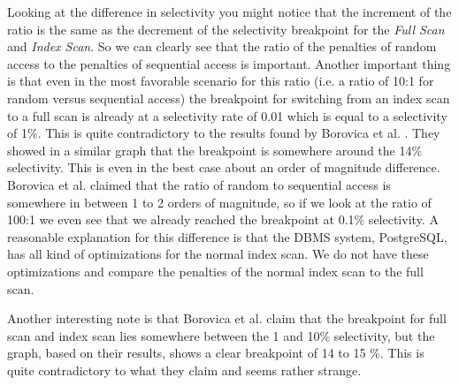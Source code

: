 \documentclass[a4paper,11pt,twoside]{article}
\begin{document}
Looking at the difference in selectivity you might notice that the increment of the ratio is the same as the decrement of the selectivity breakpoint for the  \textit{Full Scan} and \textit{Index Scan}. So we can clearly see that the ratio of the penalties of random access to the penalties of sequential access is important. Another important thing is that even in the most favorable scenario for this ratio (i.e. a ratio of 10:1 for random versus sequential access) the breakpoint for switching from an index scan to a full scan is already at a selectivity rate of 0.01 which is equal to a selectivity of 1$\%$. This is quite contradictory to the results found by Borovica et al. \cite{smoothscan}. They showed in a similar graph that the breakpoint is somewhere around the 14$\%$ selectivity. This is even in the best case about an order of magnitude difference. Borovica et al. claimed that the ratio of random to sequential access is somewhere in between 1 to 2 orders of magnitude, so if we look at the ratio of 100:1 we even see that we already reached the breakpoint at 0.1$\%$ selectivity. A reasonable explanation for this difference is that the DBMS system, PostgreSQL, has all kind of optimizations for the normal index scan. We do not have these optimizations and compare the penalties of the normal index scan to the full scan.

Another interesting note is that Borovica et al. \cite{smoothscan} claim that the breakpoint for full scan and index scan lies somewhere between the 1 and 10$\%$ selectivity, but the graph, based on their results, shows a clear breakpoint of 14 to 15 $\%$. This is quite contradictory to what they claim and seems rather strange.
\end{document}
